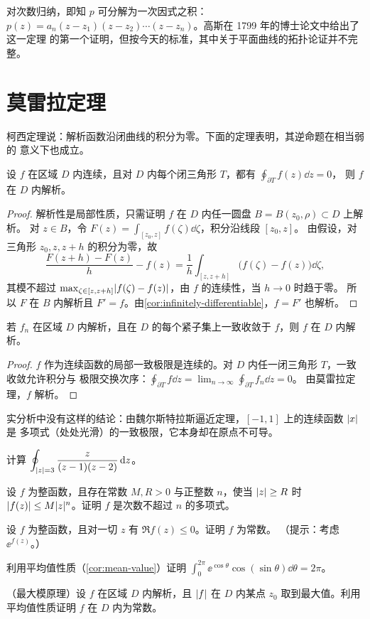 \documentclass{mojing-notes}
\begin{document}
\begin{remark}
对次数归纳，即知 $p$ 可分解为一次因式之积：
$p(z)=a_n(z-z_1)(z-z_2)\dotsm(z-z_n)$。高斯在 1799 年的博士论文中给出了这一定理
的第一个证明，但按今天的标准，其中关于平面曲线的拓扑论证并不完整。
\end{remark}

\section{莫雷拉定理}

柯西定理说：解析函数沿闭曲线的积分为零。下面的定理表明，其逆命题在相当弱的
意义下也成立。

\begin{theorem}[莫雷拉]\label{thm:morera}
设 $f$ 在区域 $D$ 内连续，且对 $D$ 内每个闭三角形 $T$，都有 $\oint_{\partial T}f(z)\dd z=0$，
则 $f$ 在 $D$ 内解析。
\end{theorem}

\begin{proof}
解析性是局部性质，只需证明 $f$ 在 $D$ 内任一圆盘 $B=B(z_0,\rho)\subset D$ 上解析。
对 $z\in B$，令 $F(z)=\int_{[z_0,z]}f(\zeta)\dd\zeta$，积分沿线段 $[z_0,z]$。
由假设，对三角形 $z_0,z,z+h$ 的积分为零，故
\[
  \frac{F(z+h)-F(z)}{h}-f(z)=\frac1h\int_{[z,z+h]}\bigl(f(\zeta)-f(z)\bigr)\dd\zeta,
\]
其模不超过 $\max_{\zeta\in[z,z+h]}\lvert f(\zeta)-f(z)\rvert$，由 $f$ 的连续性，当 $h\to0$ 时趋于零。
所以 $F$ 在 $B$ 内解析且 $F'=f$。由\cref{cor:infinitely-differentiable}，$f=F'$ 也解析。
\end{proof}

\begin{corollary}[魏尔斯特拉斯]\label{cor:weierstrass}
若 $f_n$ 在区域 $D$ 内解析，且在 $D$ 的每个紧子集上一致收敛于 $f$，则 $f$ 在 $D$ 内解析。
\end{corollary}

\begin{proof}
$f$ 作为连续函数的局部一致极限是连续的。对 $D$ 内任一闭三角形 $T$，一致收敛允许积分与
极限交换次序：$\oint_{\partial T}f\dd z=\lim_{n\to\infty}\oint_{\partial T}f_n\dd z=0$。
由莫雷拉定理，$f$ 解析。
\end{proof}

实分析中没有这样的结论：由魏尔斯特拉斯逼近定理，$[-1,1]$ 上的连续函数 $\lvert x\rvert$ 是
多项式（处处光滑）的一致极限，它本身却在原点不可导。

\begin{exercises}
  \item 计算 $\displaystyle\oint_{\lvert z\rvert=3}\frac{z}{(z-1)(z-2)}\mathop{}\!\mathrm{d} z$。
  \item 设 $f$ 为整函数，且存在常数 $M,R>0$ 与正整数 $n$，使当 $\lvert z\rvert\ge R$ 时
        $\lvert f(z)\rvert\le M\lvert z\rvert^n$。证明 $f$ 是次数不超过 $n$ 的多项式。
  \item 设 $f$ 为整函数，且对一切 $z$ 有 $\Re f(z)\le0$。证明 $f$ 为常数。
        （提示：考虑 $\ee^{f(z)}$。）
  \item 利用平均值性质（\cref{cor:mean-value}）证明 $\displaystyle
        \int_0^{2\pi}\ee^{\cos\theta}\cos(\sin\theta)\dd\theta=2\pi$。
  \item\hard （最大模原理）设 $f$ 在区域 $D$ 内解析，且 $\lvert f\rvert$ 在 $D$ 内某点 $z_0$
        取到最大值。利用平均值性质证明 $f$ 在 $D$ 内为常数。
\end{exercises}
\end{document}
